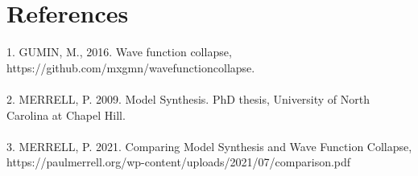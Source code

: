 \documentclass{article}
\begin{document}
\section*{References}

1. GUMIN, M., 2016. Wave function collapse, https://github.com/mxgmn/wavefunctioncollapse.
\\\\
2. MERRELL, P. 2009. Model Synthesis. PhD thesis, University of North Carolina at Chapel Hill.
\\\\
3. MERRELL, P. 2021. Comparing Model Synthesis and Wave Function Collapse, https://paulmerrell.org/wp-content/uploads/2021/07/comparison.pdf
\end{document}
